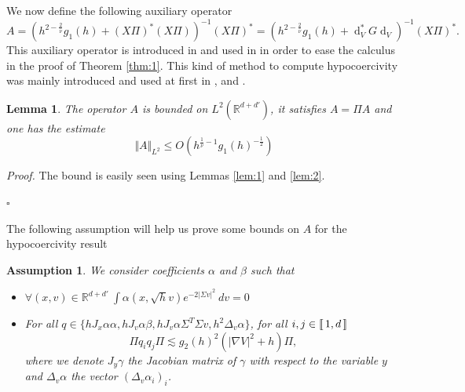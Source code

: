 \documentclass[12pt]{amsart}
\newcommand{\R}{\mathbb R}
\newcommand{\bp}{{\it Proof. }}
\newcommand{\ep}{\hfill $\square$}
\renewcommand{\d}{\operatorname{d}}
\numberwithin{equation}{section}
\numberwithin{figure}{section}
\newcommand{\dv}{\ dv}
\newcommand{\lb}{\operatorname{[\negthinspace [}}
\newcommand{\rb}{\operatorname{]\negthinspace ]}}
\newtheorem{lemma}[defin]{Lemma}
\newtheorem{assumption}{Assumption}
\begin{document}
We now define the following auxiliary operator
\begin{equation}\label{eq:A}
A = (h^{2-\frac2{\overline{\nu}}}g_1(h) + (X\Pi)^*(X\Pi))^{-1}(X\Pi)^* = (h^{2-\frac2{\overline{\nu}}}g_1(h) + \d_V^*G\d_V)^{-1}(X\Pi)^*.
\end{equation}
This auxiliary operator is introduced in \cite{DoMoSc15} and used %
in \cite{LeSaSt20} in %
order to ease the calculus in the proof of Theorem \ref{thm:1}. This kind of %
method to %
compute hypocoercivity was mainly introduced and used at first in \cite{Vi09}, \cite{HeNi04} %
and \cite{He06}.
\begin{lemma}\label{lem:Aborne}
The %
operator $A$ is bounded on $L^2(\R^{d+d'})$, it satisfies $A = \Pi A$ and one has the estimate
\begin{equation*}
\Vert A\Vert_{L^2}\leq O(h^{\frac1{\overline{\nu}}-1}g_1(h)^{-\frac12})
\end{equation*}
\end{lemma}
\bp The bound is easily seen using Lemmas \ref{lem:1} and \ref{lem:2}.

\ep

The following assumption will help us prove some bounds on $A$ for the hypocoercivity result

\begin{assumption}\label{ass.hypocoer}
    We consider coefficients $\alpha$ and $\beta$ such that
    \begin{itemize}
        \item[$i)$] $\forall (x,v)\in\R^{d+d'}\ \int \alpha(x,\sqrt{h}v)e^{-2|\Sigma v|^2}\dv = 0$
        \item[$ii)$] For all $q\in\{hJ_x\alpha\alpha,hJ_v\alpha\beta,hJ_v\alpha\Sigma^T\Sigma v,h^2\Delta_v\alpha\}$, for all $i,j\in\lb1,d\rb$
        \begin{equation*}
        \Pi q_iq_j\Pi \lesssim g_2(h)^2(|\nabla V|^2+h)\Pi,
        \end{equation*}
        where we denote $J_y\gamma$ the Jacobian matrix of $\gamma$ with respect %
to the variable $y$ and $\Delta_v\alpha$ the vector $(\Delta_v\alpha_i)_i$.
    \end{itemize}
\end{assumption}
\end{document}
